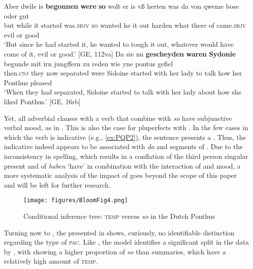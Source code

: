 \documentclass[output=paper,colorlinks,citecolor=brown]{langscibook}
\begin{document}
\ea\label{ex:PQP}
\ea \label{ex:PQP1}
\gll Aber dwile is \textbf{begonnen} \textbf{were} \textbf{so} wolt er is vß herten was da von qweme bose oder gut \\
but while it started was.\textsc{sbjv} \textsc{so} wanted he it out harden what there of came.\textsc{sbjv} evil or good\\
\glt `But since he had started it, he wanted to tough it out, whatever would have come of it, evil or good.' \hfill [GE, 112va]
\ex \label{ex:PQP2}
\gll Da sie nu \textbf{gescheyden} \textbf{waren} \textbf{Sydonie} begunde mit irn jungffern zu reden wie yne pontus gefiel\\
then.\textsc{cnj} they now separated were Sidoine started with her lady to talk how her Ponthus pleased\\
\glt `When they had separated, Sidoine started to talk with her lady about how she liked Ponthus.' \hfill [GE, 16rb]
\z
\z

\noindent Yet, all adverbial clauses with a  verb  that combine with \textit{so} have subjunctive verbal mood, as in . This is also the case for pluperfects with . In the few cases in which the verb is indicative (e.g., \ref{ex:PQP2}), the sentence presents a . Thus, the indicative  indeed appears to be associated with \textit{da} and segments of . Due to the inconsistency in spelling, which results in a conflation of the third person singular present and  of \textit{haben} `have' in combination with the interaction of  and mood, a more systematic analysis of the impact of  goes beyond the scope of this paper and will be left for further research.

\begin{figure}
\caption{Conditional inference tree: \textsc{temp} versus \textit{so} in the Dutch Ponthus}\label{fig:3}
	\texttt{[image: figures/BloomFig4.png]}
\end{figure}

Turning now to , the  presented in  shows, curiously, no identifiable distinction regarding the type of \textsc{pac}. Like , the model identifies a significant split in the data by , with  showing a higher proportion of \textit{so} than summaries, which have a relatively high amount of \textsc{temp}. 
\end{document}
